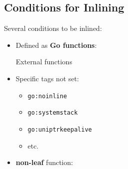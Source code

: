 \subsection{Conditions for Inlining}
\begin{frame}[t,fragile]
	\frametitlesubs

	Several conditions to be inlined:

	\begin{itemize}
		\item<+->[\emoji{check-mark-button}] Defined as \textbf{Go functions}:

		       External functions

		\item<+->[\emoji{check-mark-button}] Specific tags not set:

		      \begin{itemize}
			      \item \texttt{go:noinline}
			      \item \texttt{go:systemstack}
			      \item \texttt{go:uniptrkeepalive}
			      \item etc.
		      \end{itemize}

		\item<+->[\emoji{check-mark-button}] \textbf{non-leaf} function:



	\end{itemize}
\end{frame}
